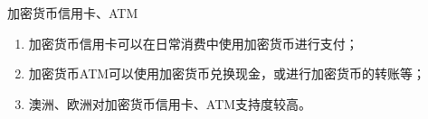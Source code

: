 \documentclass[11pt]{beamer}
\begin{document}
\begin{frame}{加密货币信用卡、ATM}

	\begin{minipage}[t]{0.5\linewidth}
		\centering
		\begin{enumerate}
			\item 加密货币信用卡可以在日常消费中使用加密货币进行支付；
			\item 加密货币ATM可以使用加密货币兑换现金，或进行加密货币的转账等；
			\item 澳洲、欧洲对加密货币信用卡、ATM支持度较高。
		\end{enumerate}

	\end{minipage}%
	\begin{minipage}[t]{0.4\linewidth}
		\begin{figure}
			\centering
		\end{figure}
	\end{minipage}%
\end{frame}
\end{document}
